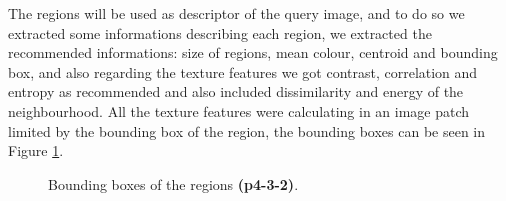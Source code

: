 \documentclass[12pt,a4paper]{article}
\begin{document}
	The regions will be used as descriptor of the query image, and to do so we extracted some informations describing each region, we extracted the recommended informations: size of regions, mean colour, centroid and bounding box, and also regarding the texture features we got contrast, correlation and entropy as recommended and also included dissimilarity and energy of the neighbourhood. All the texture features were calculating in an image patch limited by the bounding box of the region, the bounding boxes can be seen in Figure \ref{fig:bbox}.

\begin{figure}[!h]
	\centering
		{
			\setlength{\fboxsep}{1pt}
			\setlength{\fboxrule}{1pt}
		}
	\caption{Bounding boxes of the regions \textbf{(p4-3-2)}.}
	\label{fig:bbox}
\end{figure}

\end{document}

